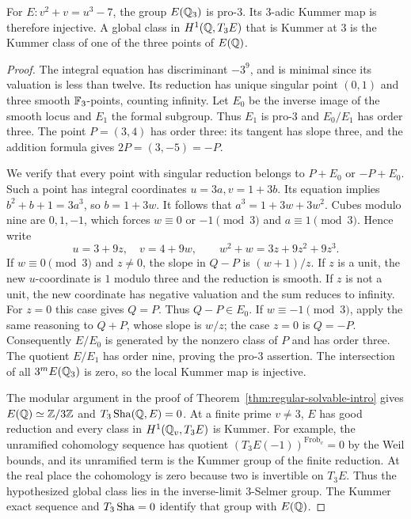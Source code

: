\begin{lemma}\label{lem:cubiclocal}
For $E:v^2+v=u^3-7$, the group $E(\mathbb Q_3)$ is pro-$3$. Its
$3$-adic Kummer map is therefore injective. A global class in
$H^1(\mathbb Q,T_3E)$ that is Kummer at $3$ is the Kummer class of one of
the three points of $E(\mathbb Q)$.
\end{lemma}
\begin{proof}
The integral equation has discriminant $-3^9$, and is minimal since
its valuation is less than twelve. Its reduction has unique singular
point $(0,1)$ and three smooth $\mathbb F_3$-points, counting infinity.
Let $E_0$ be the inverse image of the smooth locus and $E_1$ the
formal subgroup. Thus $E_1$ is pro-$3$ and $E_0/E_1$ has order three.
The point $P=(3,4)$ has order three: its tangent has slope three,
and the addition formula gives $2P=(3,-5)=-P$.

We verify that every point with singular reduction belongs to
$P+E_0$ or $-P+E_0$. Such a point has integral coordinates
$u=3a,v=1+3b$. Its equation implies $b^2+b+1=3a^3$, so
$b=1+3w$. It follows that $a^3=1+3w+3w^2$. Cubes modulo nine
are $0,1,-1$, which forces $w\equiv0$ or $-1\pmod3$ and
$a\equiv1\pmod3$. Hence write
\[
 u=3+9z,\quad v=4+9w,\qquad
 w^2+w=3z+9z^2+9z^3.
\]
If $w\equiv0\pmod3$ and $z\ne0$, the slope in $Q-P$ is
$(w+1)/z$. If $z$ is a unit, the new $u$-coordinate is $1$ modulo
three and the reduction is smooth. If $z$ is not a unit, the new
coordinate has negative valuation and the sum reduces to infinity.
For $z=0$ this case gives $Q=P$. Thus $Q-P\in E_0$.
If $w\equiv-1\pmod3$, apply the same reasoning to $Q+P$,
whose slope is $w/z$; the case $z=0$ is $Q=-P$.
Consequently $E/E_0$ is generated by the nonzero class of $P$ and
has order three. The quotient $E/E_1$ has order nine, proving the
pro-$3$ assertion. The intersection of all $3^mE(\mathbb Q_3)$ is zero,
so the local Kummer map is injective.

The modular argument in the proof of Theorem~\ref{thm:regular-solvable-intro}
gives $E(\mathbb Q)\simeq\mathbb Z/3\mathbb Z$ and $T_3\operatorname{Sha}(\mathbb Q,E)=0$. At a finite
prime $v\ne3$, $E$ has good reduction and every class in
$H^1(\mathbb Q_v,T_3E)$ is Kummer. For example, the unramified cohomology
sequence has quotient $(T_3E(-1))^{\operatorname{Frob}_v}=0$ by
the Weil bounds, and its unramified term is the Kummer group of
the finite reduction. At the real place the cohomology is zero
because two is invertible on $T_3E$. Thus the hypothesized global
class lies in the inverse-limit $3$-Selmer group. The Kummer exact
sequence and $T_3\operatorname{Sha}=0$ identify that group with $E(\mathbb Q)$.
\end{proof}

